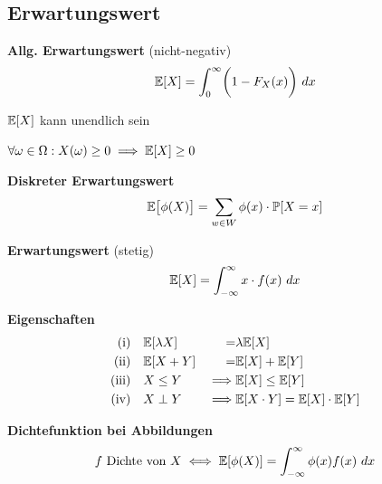 \subsection{Erwartungswert}

 \textbf{Allg. Erwartungswert} (nicht-negativ)
$$
    \mathbb{E}[X] = \int_{0}^{\infty} \biggl( 1-F_X(x) \biggr)\ dx
$$

{\scriptsize
    \remark $\mathbb{E}[X]$ kann unendlich sein
}

\theorem $\forall \omega \in \Omega: X(\omega) \geq 0 \implies \mathbb{E}[X] \geq 0$\\



\theorem \textbf{Diskreter Erwartungswert}\\
$$
    \mathbb{E}\bigl[ \phi(X) \bigr] = \sum_{w \in W} \phi(x) \cdot \mathbb{P}[X = x]
$$

 \textbf{Erwartungswert} (stetig)\\
$$ 
    \mathbb{E}[X] = \int_{-\infty}^{\infty} x \cdot f(x)\ dx
$$

\theorem \textbf{Eigenschaften}\\
\begin{align*}
    \text{(i)}      &\quad \mathbb{E}[\lambda X]    &=&         \lambda \mathbb{E}[X]                   \\
    \text{(ii)}     &\quad \mathbb{E}[X + Y]        &=&         \mathbb{E}[X] + \mathbb{E}[Y]                   \\
    \text{(iii)}    &\quad X \leq Y         &\implies&  \mathbb{E}[X] \leq \mathbb{E}[Y]                \\
    \text{(iv)}     &\quad X \perp Y        &\implies&  \mathbb{E}[X\cdot Y] = \mathbb{E}[X]\cdot\mathbb{E}[Y]
\end{align*}

\theorem \textbf{Dichtefunktion bei Abbildungen}\\
$$
    f \text{ Dichte von } X \iff \mathbb{E}[\phi(X)] = \int_{-\infty}^{\infty}\phi(x)f(x)\ dx
$$

